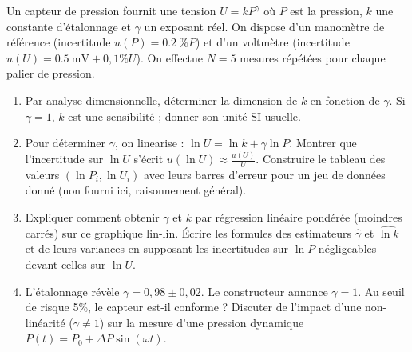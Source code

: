 \documentclass[11pt]{article}
\begin{document}
\begin{exercice}
Un capteur de pression fournit une tension $U = k P^\gamma$ où $P$ est la pression, $k$ une constante d'étalonnage et $\gamma$ un exposant réel. On dispose d'un manomètre de référence (incertitude $u(P) = \SI{0.2}{\%} P$) et d'un voltmètre (incertitude $u(U) = \SI{0.5}{\milli\volt} + 0,1\% U$). On effectue $N=5$ mesures répétées pour chaque palier de pression.

\begin{enumerate}
    \item Par analyse dimensionnelle, déterminer la dimension de $k$ en fonction de $\gamma$. Si $\gamma = 1$, $k$ est une sensibilité ; donner son unité SI usuelle.
    \item Pour déterminer $\gamma$, on linearise : $\ln U = \ln k + \gamma \ln P$. Montrer que l'incertitude sur $\ln U$ s'écrit $u(\ln U) \approx \frac{u(U)}{U}$. Construire le tableau des valeurs $(\ln P_i, \ln U_i)$ avec leurs barres d'erreur pour un jeu de données donné (non fourni ici, raisonnement général).
    \item Expliquer comment obtenir $\gamma$ et $k$ par régression linéaire pondérée (moindres carrés) sur ce graphique lin-lin. Écrire les formules des estimateurs $\hat{\gamma}$ et $\widehat{\ln k}$ et de leurs variances en supposant les incertitudes sur $\ln P$ négligeables devant celles sur $\ln U$.
    \item L'étalonnage révèle $\gamma = 0,98 \pm 0,02$. Le constructeur annonce $\gamma = 1$. Au seuil de risque 5\%, le capteur est-il conforme ? Discuter de l'impact d'une non-linéarité ($\gamma \neq 1$) sur la mesure d'une pression dynamique $P(t) = P_0 + \Delta P \sin(\omega t)$.
\end{enumerate}
\end{exercice}
\end{document}
